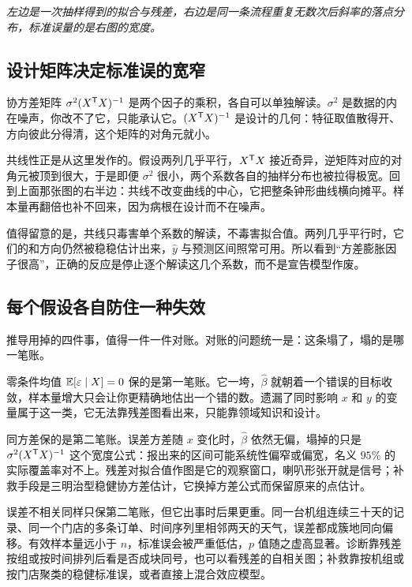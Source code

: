 \emph{左边是一次抽样得到的拟合与残差，右边是同一条流程重复无数次后斜率的落点分布，标准误量的是右图的宽度。}

\subsection{设计矩阵决定标准误的宽窄}

协方差矩阵 \(\sigma^2(X^{\mathsf{T}}X)^{-1}\) 是两个因子的乘积，各自可以单独解读。\(\sigma^2\) 是数据的内在噪声，你改不了它，只能承认它。\((X^{\mathsf{T}}X)^{-1}\) 是设计的几何：特征取值散得开、方向彼此分得清，这个矩阵的对角元就小。

共线性正是从这里发作的。假设两列几乎平行，\(X^{\mathsf{T}}X\) 接近奇异，逆矩阵对应的对角元被顶到很大，于是即便 \(\sigma^2\) 很小，两个系数各自的抽样分布也被拉得极宽。回到上面那张图的右半边：共线不改变曲线的中心，它把整条钟形曲线横向摊平。样本量再翻倍也补不回来，因为病根在设计而不在噪声。

值得留意的是，共线只毒害单个系数的解读，不毒害拟合值。两列几乎平行时，它们的和方向仍然被稳稳估计出来，\(\widehat y\) 与预测区间照常可用。所以看到``方差膨胀因子很高''，正确的反应是停止逐个解读这几个系数，而不是宣告模型作废。

\subsection{每个假设各自防住一种失效}

推导用掉的四件事，值得一件一件对账。对账的问题统一是：这条塌了，塌的是哪一笔账。

零条件均值 \(\mathbb{E}[\varepsilon \mid X] = 0\) 保的是第一笔账。它一垮，\(\widehat\beta\) 就朝着一个错误的目标收敛，样本量增大只会让你更精确地估出一个错的数。遗漏了同时影响 \(x\) 和 \(y\) 的变量属于这一类，它无法靠残差图看出来，只能靠领域知识和设计。

同方差保的是第二笔账。误差方差随 \(x\) 变化时，\(\widehat\beta\) 依然无偏，塌掉的只是 \(\sigma^2(X^{\mathsf{T}}X)^{-1}\) 这个宽度公式：报出来的区间可能系统性偏窄或偏宽，名义 \(95\%\) 的实际覆盖率对不上。残差对拟合值作图是它的观察窗口，喇叭形张开就是信号；补救手段是三明治型稳健协方差估计，它换掉方差公式而保留原来的点估计。

误差不相关同样只保第二笔账，但它出事时后果更重。同一台机组连续三十天的记录、同一个门店的多条订单、时间序列里相邻两天的天气，误差都成簇地同向偏移。有效样本量远小于 \(n\)，标准误会被严重低估，\(p\) 值随之虚高显著。诊断靠残差按组或按时间排列后看是否成块同号，也可以看残差的自相关图；补救靠按机组或按门店聚类的稳健标准误，或者直接上混合效应模型。

